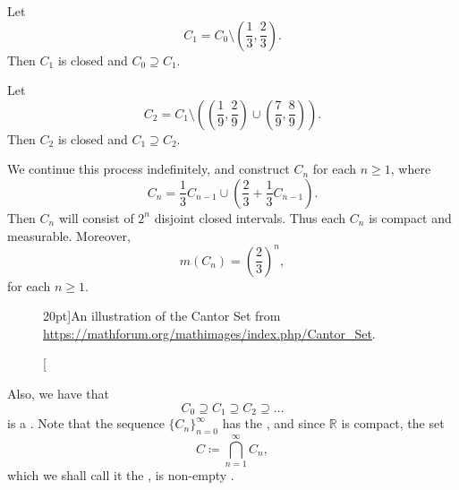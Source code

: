\documentclass[notoc,notitlepage]{tufte-book}
\begin{document}
\begin{eg}
  Let
  \begin{equation*}
    C_1 = C_0 \setminus \left( \frac{1}{3}, \frac{2}{3} \right).
  \end{equation*}
  Then $C_1$ is closed  and
  $C_0 \supseteq C_1$.

  Let
  \begin{equation*}
    C_2 = C_1 \setminus \left( \left( \frac{1}{9}, \frac{2}{9} \right) \cup
    \left( \frac{7}{9}, \frac{8}{9} \right) \right).
  \end{equation*}
  Then $C_2$ is closed and $C_1 \supseteq C_2$.

  We continue this process indefinitely, and construct $C_n$ for each $n \geq
  1$, where
  \begin{equation*}
    C_n = \frac{1}{3} C_{n-1} \cup \left( \frac{2}{3} + \frac{1}{3} C_{n-1} \right).
  \end{equation*}
  Then $C_n$ will consist of $2^n$ disjoint closed intervals. Thus each $C_n$ is
  compact and measurable. Moreover,
  \begin{equation*}
    m (C_n) = \left( \frac{2}{3} \right)^n,
  \end{equation*}
  for each $n \geq 1$.

  \begin{figure}[t]
    \centering
    \caption[][20pt]{An illustration of the Cantor Set from \url{https://mathforum.org/mathimages/index.php/Cantor_Set}.}\label{fig:an_illustration_of_the_cantor_set_from_https_}
  \end{figure}
  
  Also, we have that
  \begin{equation*}
    C_0 \supseteq C_1 \supseteq C_2 \supseteq \hdots
  \end{equation*}
  is a . Note that the sequence $\{
  C_n \}_{n=0}^{\infty}$ has the , and
  since $\mathbb{R}$ is compact, the set
  \begin{equation*}
    C \coloneqq \bigcap_{n=1}^{\infty} C_n,
  \end{equation*}
  which we shall call it the , is non-empty .


\end{eg}
\end{document}
